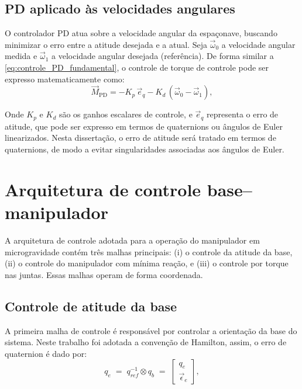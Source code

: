 \subsection{PD aplicado às velocidades angulares}
O controlador PD atua sobre a velocidade angular da espaçonave, buscando minimizar o erro entre a atitude desejada e a atual.
Seja $\vec{\omega}_0$ a velocidade angular medida e $\vec{\omega}_1$ a velocidade angular desejada (referência).
De forma similar a \eqref{eq:controle_PD_fundamental}, o controle de torque de controle pode ser expresso matematicamente como:
\begin{equation}
\vec{M}_{\text{PD}} = -K_p \, \vec{e}_q - K_d \, (\vec{\omega}_0 - \vec{\omega}_1),
\label{eq:torque_PD}
\end{equation}

Onde $K_p$ e $K_d$ são os ganhos escalares de controle, e $\vec{e}_q$ representa o erro de atitude, que pode ser expresso em termos de quaternions ou ângulos de Euler linearizados.  
Nesta dissertação, o erro de atitude será tratado em termos de quaternions, de modo a evitar singularidades associadas aos ângulos de Euler.

\section{Arquitetura de controle base--manipulador}
A arquitetura de controle adotada para a operação do manipulador em microgravidade contém três malhas principais: (i) o controle da atitude da base, (ii) o controle do manipulador com mínima reação, e (iii) o controle por torque nas juntas. Essas malhas operam de forma coordenada.

\subsection{Controle de atitude da base}
A primeira malha de controle é responsável por controlar a orientação da base do sistema.
Neste trabalho foi adotada a convenção de Hamilton, assim, o erro de quaternion é dado por:
\begin{equation}
    q_e \;=\; q_{ref}^{-1} \otimes q_b \;=\;
    \begin{bmatrix}
        q_{e} \\[2pt] \vec {\epsilon}_e
    \end{bmatrix},
    \label{eq:erro_quaternion1}
\end{equation}

